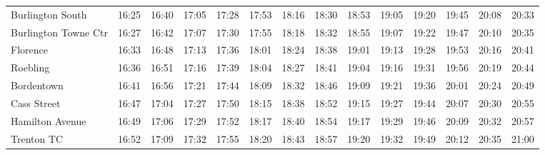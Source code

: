 \begin{center}
\begin{tabular}{@{}lrrrrrrrrrrrrr@{}}
Burlington South & 16:25 & 16:40 & 17:05 & 17:28 & 17:53 & 18:16 & 18:30 & 18:53 & 19:05 & 19:20 & 19:45 & 20:08 & 20:33 \\
Burlington Towne Ctr & 16:27 & 16:42 & 17:07 & 17:30 & 17:55 & 18:18 & 18:32 & 18:55 & 19:07 & 19:22 & 19:47 & 20:10 & 20:35 \\
Florence & 16:33 & 16:48 & 17:13 & 17:36 & 18:01 & 18:24 & 18:38 & 19:01 & 19:13 & 19:28 & 19:53 & 20:16 & 20:41 \\
Roebling & 16:36 & 16:51 & 17:16 & 17:39 & 18:04 & 18:27 & 18:41 & 19:04 & 19:16 & 19:31 & 19:56 & 20:19 & 20:44 \\
Bordentown & 16:41 & 16:56 & 17:21 & 17:44 & 18:09 & 18:32 & 18:46 & 19:09 & 19:21 & 19:36 & 20:01 & 20:24 & 20:49 \\
Cass Street & 16:47 & 17:04 & 17:27 & 17:50 & 18:15 & 18:38 & 18:52 & 19:15 & 19:27 & 19:44 & 20:07 & 20:30 & 20:55 \\
Hamilton Avenue & 16:49 & 17:06 & 17:29 & 17:52 & 18:17 & 18:40 & 18:54 & 19:17 & 19:29 & 19:46 & 20:09 & 20:32 & 20:57 \\
Trenton TC & 16:52 & 17:09 & 17:32 & 17:55 & 18:20 & 18:43 & 18:57 & 19:20 & 19:32 & 19:49 & 20:12 & 20:35 & 21:00 \\
\bottomrule\end{tabular}\end{center}

